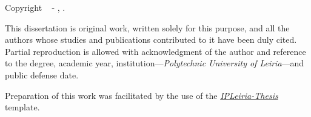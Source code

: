{{    \noindent Copyright \textcopyright~\the\year{} - \GetFirstAuthor, \GetSchool.

    \vspace{.575em}

    \noindent This dissertation is original work, written solely for this purpose, and all the authors whose studies and publications contributed to it have been duly cited. Partial reproduction is allowed with acknowledgment of the author and reference to the degree, academic year, institution---\textit{Polytechnic University of Leiria}---and public defense date.

    \vspace{1.395em}

    \noindent{}

    \vspace{.935em}

    \noindent Preparation of this work was facilitated by the use of the \href{https://github.com/joseareia/ipleiria-thesis}{\textit{IPLeiria-Thesis}} template.
}}

\vspace*{\fill}
\MediaOptionLogic
